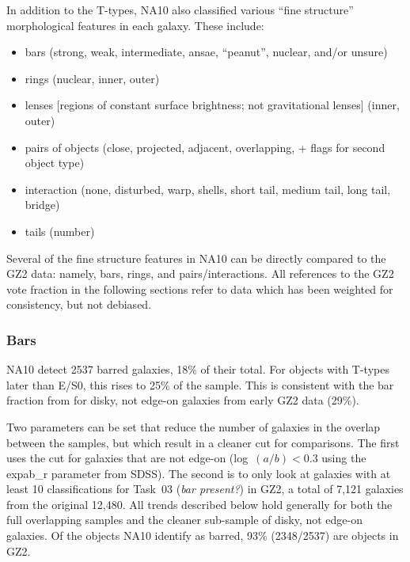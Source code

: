 \documentclass[useAMS,usenatbib]{mn2e}
\begin{document}
In addition to the T-types, NA10 also classified various ``fine structure'' morphological features in each galaxy. These include:

\begin{itemize}
	\item bars (strong, weak, intermediate, ansae, ``peanut'', nuclear, and/or unsure)
	\item rings (nuclear, inner, outer)
	\item lenses [regions of constant surface brightness; not gravitational lenses] (inner, outer)
	\item pairs of objects (close, projected, adjacent, overlapping, + flags for second object type)
	\item interaction (none, disturbed, warp, shells, short tail, medium tail, long tail, bridge)
	\item tails (number)
\end{itemize}

Several of the fine structure features in NA10 can be directly compared to the GZ2 data: namely, bars, rings, and pairs/interactions. All references to the GZ2 vote fraction in the following sections refer to data which has been weighted for consistency, but not debiased. 

\subsubsection{Bars}

NA10 detect 2537 barred galaxies, 18\% of their total. For objects with T-types later than E/S0, this rises to 25\% of the sample. This is consistent with the bar fraction from \citep{mas11c} for disky, not edge-on galaxies from early GZ2 data (29\%). 

Two parameters can be set that reduce the number of galaxies in the overlap between the samples, but which result in a cleaner cut for comparisons. The first uses the \citet{mas11c} cut for galaxies that are not edge-on (log~$(a/b) < 0.3$ using the {\sc expab\_r} parameter from SDSS). The second is to only look at galaxies with at least 10 classifications for Task~03 ({\it bar present?}) in GZ2, a total of 7,121 galaxies from the original 12,480. All trends described below hold generally for both the full overlapping samples and the cleaner sub-sample of disky, not edge-on galaxies. Of the objects NA10 identify as barred, 93\% (2348/2537) are objects in GZ2. 
\end{document}
